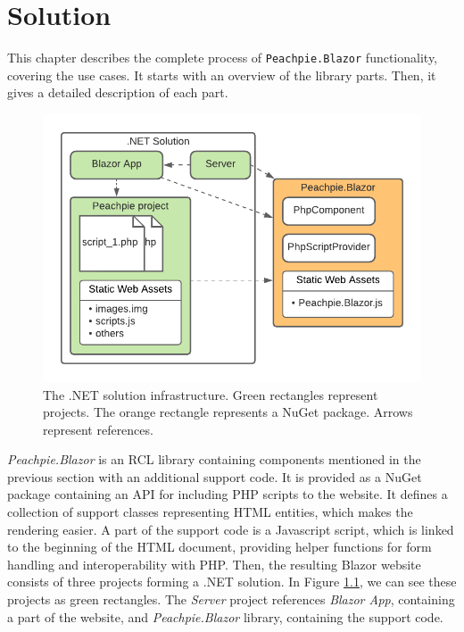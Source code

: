 \chapter{Solution}

This chapter describes the complete process of \texttt{Peachpie.Blazor} functionality, covering the use cases.
It starts with an overview of the library parts.
Then, it gives a detailed description of each part.
\par
\begin{figure}[b!]
\centering
\includegraphics[scale=0.9]{./img/SolutionInfrastructure}
\caption{The .NET solution infrastructure. Green rectangles represent projects. The orange rectangle represents a NuGet package. Arrows represent references.}
\label{img13:infrastructure}
\end{figure} 
\par
\textit{Peachpie.Blazor} is an RCL library containing components mentioned in the previous section with an additional support code.
It is provided as a NuGet package containing an API for including PHP scripts to the website.
It defines a collection of support classes representing HTML entities, which makes the rendering easier.
A part of the support code is a Javascript script, which is linked to the beginning of the HTML document, providing helper functions for form handling and interoperability with PHP.
Then, the resulting Blazor website consists of three projects forming a .NET solution.
In Figure \ref{img13:infrastructure}, we can see these projects as green rectangles.
The \textit{Server} project references \textit{Blazor App}, containing a part of the website, and \textit{Peachpie.Blazor} library, containing the support code.

